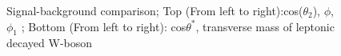 \begin{figure}[h!]\ContinuedFloat
	 \caption{Signal-background comparison; Top (From left to right):cos($\theta_2$), $\phi$, $\phi_1$  ; Bottom (From left to right): cos$\theta^{\ast}$, transverse mass of leptonic decayed W-boson}
\end{figure}

\clearpage
